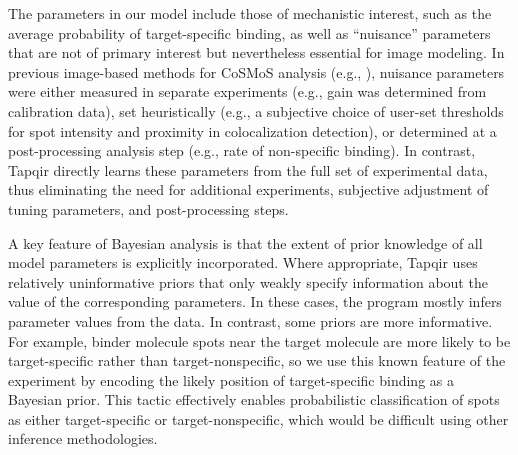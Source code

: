 The parameters in our model include those of mechanistic interest, such as the average probability of target-specific binding, as well as ``nuisance'' parameters that are not of primary interest but nevertheless essential for image modeling. In previous image-based methods for CoSMoS analysis (e.g., \cite{Friedman2015-nx,Smith2019-yb}), nuisance parameters were either measured in separate experiments (e.g., gain was determined from calibration data), set heuristically (e.g., a subjective choice of user-set thresholds for spot intensity and proximity in colocalization detection), or determined at a post-processing analysis step (e.g., rate of non-specific binding). In contrast, Tapqir directly learns these parameters from the full set of experimental data, thus eliminating the need for additional experiments, subjective adjustment of tuning parameters, and post-processing steps.

A key feature of Bayesian analysis is that the extent of prior knowledge of all model parameters is explicitly incorporated. Where appropriate, Tapqir uses relatively uninformative priors that only weakly specify information about the value of the corresponding parameters.  In these cases, the program mostly infers parameter values from the data.  In contrast, some priors are more informative.  For example, binder molecule spots near the target molecule are more likely to be target-specific rather than target-nonspecific, so we use this known feature of the experiment by encoding the likely position of target-specific binding as a Bayesian prior. This tactic effectively enables probabilistic classification of spots as either target-specific or target-nonspecific, which would be difficult using other inference methodologies.




